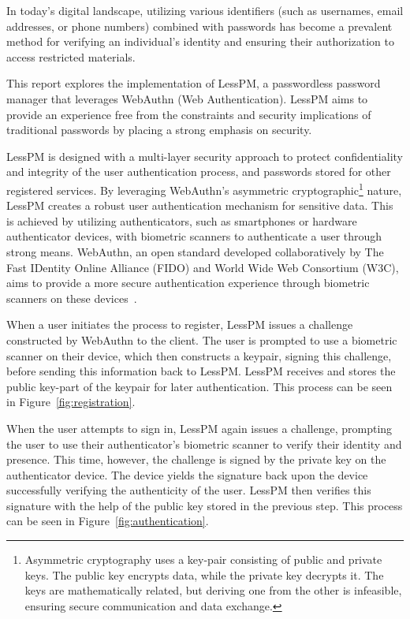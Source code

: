 


In today's digital landscape, utilizing various identifiers (such as usernames,
email addresses, or phone numbers) combined with passwords has become a
prevalent method for verifying an individual's identity and ensuring their
authorization to access restricted materials.

This report explores the implementation of LessPM, a passwordless password
manager that leverages WebAuthn (Web Authentication).
LessPM aims to provide an experience free from the constraints and security
implications of traditional passwords by placing a strong emphasis on
security.

LessPM is designed with a multi-layer security approach to protect
confidentiality and integrity of the user authentication process, and passwords
stored for other registered services.
By leveraging WebAuthn's asymmetric cryptographic\footnote{
  Asymmetric cryptography uses a key-pair consisting of public and private
  keys.
  The public key encrypts data, while the private key decrypts it.
  The keys are mathematically related, but deriving one from the other is
  infeasible, ensuring secure communication and data exchange.
} nature, LessPM creates a robust user authentication mechanism for sensitive
data.
This is achieved by utilizing authenticators, such as smartphones or
hardware authenticator devices, with biometric scanners to authenticate a
user through strong means.
WebAuthn, an open standard developed collaboratively by The Fast IDentity
Online Alliance (FIDO) and World Wide Web Consortium (W3C), aims to provide a
more secure authentication experience through biometric scanners on these
devices~\cite{webauthn-2}.

When a user initiates the process to register, LessPM issues a challenge
constructed by WebAuthn to the client.
The user is prompted to use a biometric scanner on their device, which then
constructs a keypair, signing this challenge, before sending this information
back to LessPM\@.
LessPM receives and stores the public key-part of the keypair for later
authentication.
This process can be seen in Figure~\ref{fig:registration}.

When the user attempts to sign in, LessPM again issues a challenge,
prompting the user to use their authenticator's biometric scanner to verify
their identity and presence.
This time, however, the challenge is signed by the private key on the
authenticator device.
The device yields the signature back upon the device successfully verifying the
authenticity of the user.
LessPM then verifies this signature with the help of the public key
stored in the previous step.
This process can be seen in Figure~\ref{fig:authentication}.

